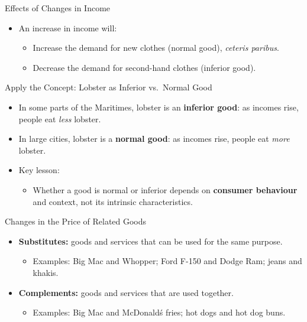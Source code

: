 \documentclass[aspectratio=169]{beamer}
\begin{document}
\begin{frame}{Effects of Changes in Income}
\transfade
\begin{itemize}[<+->]
  \item An increase in income will:
  \begin{itemize}[<+->]
    \item Increase the demand for new clothes (normal good), \emph{ceteris paribus}.
    \item Decrease the demand for second-hand clothes (inferior good).
  \end{itemize}
\end{itemize}
\end{frame}

\begin{frame}{Apply the Concept: Lobster as Inferior vs.\ Normal Good}
\transfade
\small
\begin{itemize}[<+->]
  \item In some parts of the Maritimes, lobster is an \textbf{inferior good}: as incomes rise, people eat \emph{less} lobster.
  \item In large cities, lobster is a \textbf{normal good}: as incomes rise, people eat \emph{more} lobster.
  \item Key lesson:
  \begin{itemize}[<+->]
    \item Whether a good is normal or inferior depends on \textbf{consumer behaviour} and context, not its intrinsic characteristics.
  \end{itemize}
\end{itemize}
\end{frame}

\begin{frame}{Changes in the Price of Related Goods}
\transfade
\begin{itemize}[<+->]
  \item \textbf{Substitutes:} goods and services that can be used for the same purpose.
  \begin{itemize}[<+->]
    \item Examples: Big Mac and Whopper; Ford F-150 and Dodge Ram; jeans and khakis.
  \end{itemize}
  \item \textbf{Complements:} goods and services that are used together.
  \begin{itemize}[<+->]
    \item Examples: Big Mac and McDonald\'s fries; hot dogs and hot dog buns.
  \end{itemize}
\end{itemize}
\end{frame}
\end{document}
